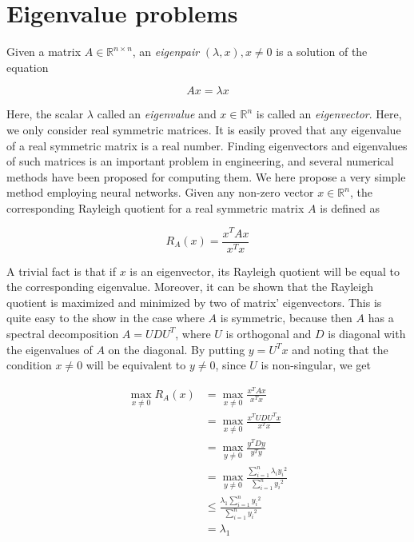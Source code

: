 \documentclass{article}
\begin{document}
\section{Eigenvalue problems}
Given a matrix $A \in \mathbb{R}^{n \times n}$, an \textit{eigenpair} $(\lambda, x), x \neq 0$ is a solution of the equation

\begin{equation}
    Ax = \lambda x
\end{equation}

Here, the scalar $\lambda$ called an \textit{eigenvalue} and $x \in \mathbb{R}^n$ is called an \textit{eigenvector}. Here, we only consider real symmetric matrices. It is easily proved that any eigenvalue of a real symmetric matrix is a real number. Finding eigenvectors and eigenvalues of such matrices is an important problem in engineering, and several numerical methods have been proposed for computing them. We here propose a very simple method employing neural networks. Given any non-zero vector $x \in \mathbb{R}^n$, the corresponding Rayleigh quotient for a real symmetric matrix $A$ is defined as

\begin{equation}
    R_A(x) = \frac{x^T A x}{x^T x}
\end{equation}

A trivial fact is that if $x$ is an eigenvector, its Rayleigh quotient will be equal to the corresponding eigenvalue. Moreover, it can be shown that the Rayleigh quotient is maximized and minimized by two of matrix' eigenvectors. This is quite easy to the show in the case where $A$ is symmetric, because then $A$ has a spectral decomposition $A=UDU^T$, where $U$ is orthogonal and $D$ is diagonal with the eigenvalues of $A$ on the diagonal. By putting $y=U^T x$ and noting that the condition $x \neq 0$ will be equivalent to $ y \neq 0$, since $U$ is non-singular, we get

\begin{align}
    \max_{x \neq 0}{R_A (x)}
    &=\max_{x \neq 0}{\frac{x^T A x}{x^T x}}\\
    &=\max_{x \neq 0}{\frac{x^T U D U^T x}{x^T x}}\\
    &=\max_{y \neq 0}{\frac{y^T D y}{y^T y}}\\
    &=\max_{y \neq 0}{ \frac{\sum_{i=1}^{n}{\lambda_i {y_i}^2 } } { \sum_{i=1}^{n} { {y_i}^2 } } } \\
    &\leq \frac{ \lambda_1  { \sum_{i=1}^{n} { {y_i}^2 } }} {  \sum_{i=1}^{n} { {y_i}^2 } }\\
    &=\lambda_1
\end{align}
\end{document}
